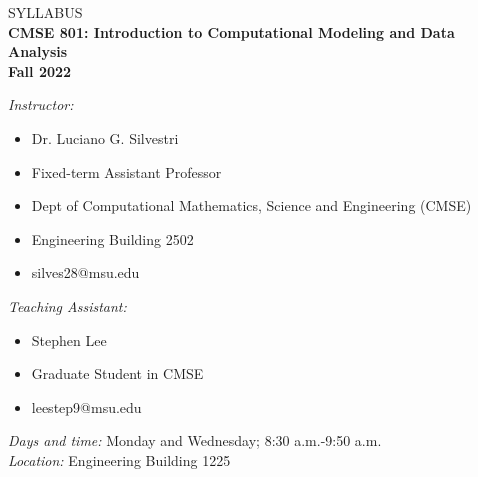 \documentclass[oneside,letterpaper,11pt]{exam}
\begin{document}
\begin{center}
  \normalsize\textsc{SYLLABUS}
  \\\vspace{0.25cm}
\textbf{CMSE 801: Introduction to Computational Modeling and Data Analysis} \\
\textbf{Fall 2022}
  \\\vspace{0.25cm}
  \vspace{0.25cm}
\end{center}
\begin{minipage}[t]{0.49\textwidth}
\emph{Instructor:} 
\begin{itemize}
\item[] Dr. Luciano G. Silvestri \\[-18pt]
\item[] Fixed-term Assistant Professor \\[-22pt]
\item[] Dept of Computational Mathematics, \phantom{aa} Science and Engineering (CMSE) \\[-22pt]
\item[] Engineering Building 2502 \\[-22pt]
\item[] silves28@msu.edu 
\end{itemize}
\end{minipage}
\begin{minipage}[t]{0.49\textwidth}
\emph{Teaching Assistant:} 
\begin{itemize}
\item[] Stephen Lee \\[-18pt]
\item[] Graduate Student in CMSE \\[-22pt]
\item[] leestep9@msu.edu
\end{itemize}
\end{minipage}

\vspace{25pt}
\begin{minipage}[t]{0.75\textwidth}
\emph{Days and time:} Monday and Wednesday; 8:30 a.m.-9:50 a.m. \\ [2.5pt]
\emph{Location:} Engineering Building 1225 
\end{minipage}
\end{document}
